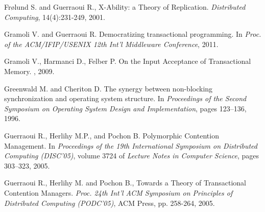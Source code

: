 \begin{thebibliography}{99}
{
Fr{\o}lund S. and Guerraoui R.,
X-Ability: a Theory of Replication.
{\it Distributed Computing}, 14(4):231-249, 2001. 




Gramoli V. and Guerraoui R.
\newblock Democratizing transactional programming.
\newblock In {\em Proc. of the ACM/IFIP/USENIX 12th Int'l Middleware
  Conference}, 2011.

Gramoli V., Harmanci D., Felber P.
\newblock On the {I}nput {A}cceptance of {T}ransactional {M}emory.
, 2009.




Greenwald M. and Cheriton D.
\newblock The synergy between non-blocking synchronization and operating system structure.
\newblock In {\em Proceedings of the Second Symposium on Operating System
Design and Implementation}, pages 123--136, 1996.





Guerraoui R., Herlihy M.P., and Pochon B.
\newblock Polymorphic {C}ontention {M}anagement.
\newblock In {\em Proceedings of the 19th {I}nternational {S}ymposium on
  {D}istributed {C}omputing ({DISC}'05)}, volume 3724 of {\em Lecture Notes in
  Computer Science}, pages 303--323, 2005.



Guerraoui R.,  Herlihy M. and  Pochon B., 
 Towards a Theory of Transactional Contention Managers. 
{\it  Proc. 24th  Int'l  ACM Symposium on Principles of  Distributed 
Computing (PODC'05)},  ACM Press, pp. 258-264,  2005. 







}
\end{thebibliography}
